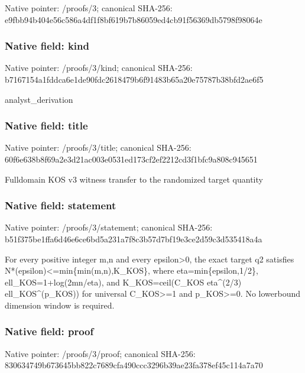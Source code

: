 \documentclass[10pt,a4paper]{article}
\begin{document}
Native pointer: /proofs/3; canonical SHA-256: e9fbb94b404e56c586a4df1f\allowbreak{}8bf619b7b86059ed4cb91f56\allowbreak{}369db5798f98064e



\subsubsection{Native field: kind}


Native pointer: /proofs/3/kind; canonical SHA-256: b7167154a1fddca6e1de90fd\allowbreak{}c2618479b6f91483b65a20e7\allowbreak{}5787b38bfd2ae6f5


analyst\_derivation


\subsubsection{Native field: title}


Native pointer: /proofs/3/title; canonical SHA-256: 60f6e638b8f69a2e3d21ac00\allowbreak{}3e0531ed173cf2ef2212cd3f\allowbreak{}1bfc9a808c945651


Fulldomain KOS v3 witness transfer to the randomized target quantity


\subsubsection{Native field: statement}


Native pointer: /proofs/3/statement; canonical SHA-256: b51f375be1ffa6d46e6ce6bd\allowbreak{}5a231a7f8c3b57d7bf19e3ce\allowbreak{}2d59c3d535418a4a


For every positive integer m,n and every epsilon>0, the exact target q2 satisfies N*(epsilon)<=min\{min(m,n),K\_KOS\}, where eta=min\{epsilon,1/2\}, ell\_KOS=1+log(2mn/eta), and K\_KOS=ceil(C\_KOS eta\textasciicircum{}(2/3) ell\_KOS\textasciicircum{}(p\_KOS)) for universal C\_KOS>=1 and p\_KOS>=0. No lowerbound dimension window is required.


\subsubsection{Native field: proof}


Native pointer: /proofs/3/proof; canonical SHA-256: 830634749b673645bb822c76\allowbreak{}89cfa490ccc3296b39ae23fa\allowbreak{}378ef45c114a7a70
\end{document}
